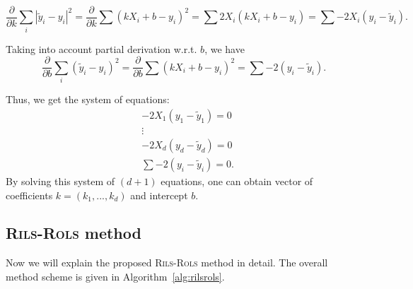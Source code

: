 \documentclass[a4paper,12pt]{elsarticle}
\begin{document}
	$$  \frac{\partial}{\partial k} \sum_{i} |\tilde{y}_i - y_i|^2 = \frac{\partial}{\partial k} \sum ( kX_i+b  - y_i)^2 =  \sum 2X_i(kX_i + b - y_i)  =  \sum -2X_i (y_i - \tilde{y}_i) . $$
	
	Taking into account   partial derivation w.r.t.  $b$, we have 
	$$  \frac{\partial}{\partial b} \sum_{i} (\tilde{y}_i - y_i)^2  = \frac{\partial}{\partial b} \sum ( kX_i+b  - y_i)^2 = \sum -2  (y_i - \tilde{y}_i). $$
	
	Thus, we get the system of equations: 
	\begin{align*}
		& -2X_1 (y_1 - \tilde{y}_1)  = 0 \\
		& \vdots \\
		& -2X_d (y_d - \tilde{y}_d)  = 0 \\
		&\sum -2  (y_i - \tilde{y}_i) = 0.
	\end{align*}
By solving this system of $(d+1)$ equations, one can obtain vector of coefficients $k=(k_1, ..., k_d)$ and intercept $b$. %
\subsection{\textsc{Rils}-\textsc{Rols}  method}
Now we will explain the proposed \textsc{Rils}-\textsc{Rols}  method in detail. The overall method scheme is given in Algorithm~\ref{alg:rilsrols}.  
\end{document}
